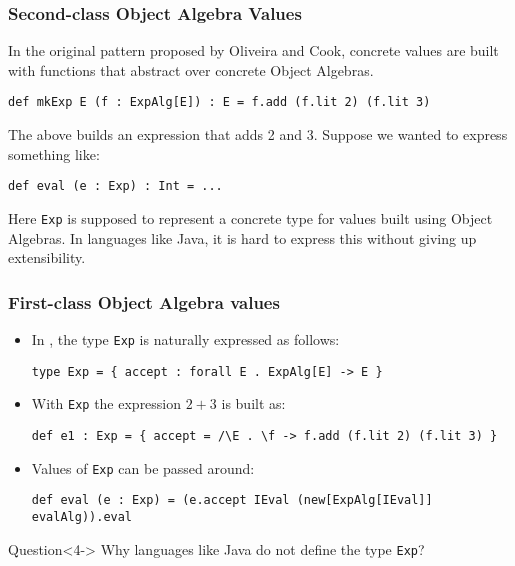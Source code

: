 \documentclass{beamer}
\begin{document}
\begin{frame}[fragile]
  \frametitle{Second-class Object Algebra Values}

In the original pattern proposed by Oliveira and Cook, concrete values are built
with functions that abstract over concrete Object Algebras.


\begin{exampleblock}{}
\begin{lstlisting}
def mkExp E (f : ExpAlg[E]) : E = f.add (f.lit 2) (f.lit 3)
\end{lstlisting}
\end{exampleblock}

The above builds an expression that adds 2 and 3. \pause Suppose we wanted to
express something like:

\begin{exampleblock}{}
\begin{lstlisting}
def eval (e : Exp) : Int = ...
\end{lstlisting}
\end{exampleblock}


Here \lstinline{Exp} is supposed to represent a concrete type for values built using
Object Algebras. \pause In languages like Java, it is hard to express this without
giving up extensibility.

\end{frame}


\begin{frame}[fragile]
  \frametitle{First-class Object Algebra values}

  \begin{itemize}[<+->]
  \item  In \name, the type \lstinline{Exp} is naturally expressed as follows:
\begin{lstlisting}
type Exp = { accept : forall E . ExpAlg[E] -> E }
\end{lstlisting}
  \item With \lstinline{Exp} the expression $2 + 3$ is built as:
\begin{lstlisting}
def e1 : Exp = { accept = /\E . \f -> f.add (f.lit 2) (f.lit 3) }
\end{lstlisting}
  \item Values of \lstinline{Exp} can be passed around:
\begin{lstlisting}
def eval (e : Exp) = (e.accept IEval (new[ExpAlg[IEval]] evalAlg)).eval
\end{lstlisting}

  \end{itemize}

  \begin{alertblock}{Question}<4->
    Why languages like Java do not define the type \lstinline{Exp}?
  \end{alertblock}

\end{frame}
\end{document}
